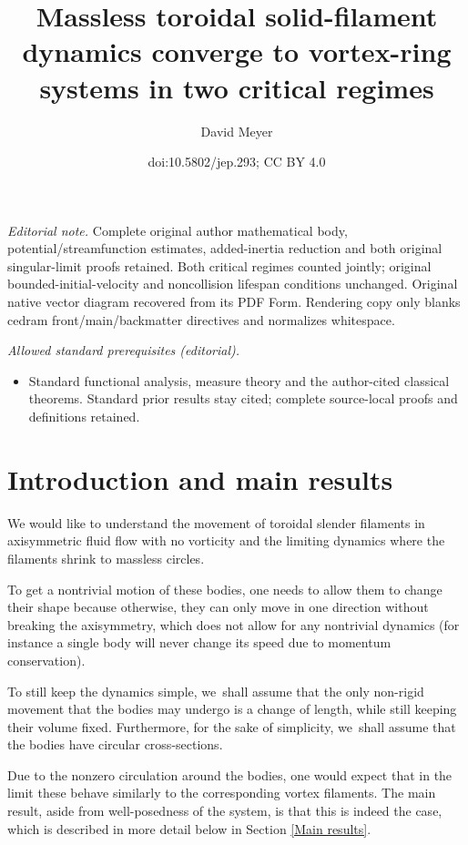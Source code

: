 \documentclass[10pt]{amsart}
\title{Massless toroidal solid-filament dynamics converge to vortex-ring systems in two critical regimes}
\author{David Meyer}
\date{doi:10.5802/jep.293; CC BY 4.0}
\theoremstyle{definition}
\begin{document}
\maketitle
\noindent\textit{Editorial note.} Complete original author mathematical body, potential/streamfunction estimates, added-inertia reduction and both original singular-limit proofs retained. Both critical regimes counted jointly; original bounded-initial-velocity and noncollision lifespan conditions unchanged. Original native vector diagram recovered from its PDF Form. Rendering copy only blanks cedram front/main/backmatter directives and normalizes whitespace.\par\medskip
\noindent\textit{Allowed standard prerequisites (editorial).}\begin{itemize}
\item Standard functional analysis, measure theory and the author-cited classical theorems. Standard prior results stay cited; complete source-local proofs and definitions retained.
\end{itemize}\medskip
\vspace*{-\baselineskip}
\tableofcontents


\section{Introduction and main results}

We would like to understand the movement of toroidal slender filaments in axisymmetric fluid flow with no vorticity and the limiting dynamics where the filaments shrink to massless circles.

To get a nontrivial motion of these bodies, one needs to allow them to change their shape because otherwise, they can only move in one direction without breaking the axisymmetry, which does not allow for any nontrivial dynamics (for instance a single body will never change its speed due to momentum conservation).

To still keep the dynamics simple, we~shall assume that the only non-rigid movement that the bodies may undergo is a change of length, while still keeping their volume fixed. Furthermore, for the sake of simplicity, we~shall assume that the bodies have circular cross-sections.

Due to the nonzero circulation
around the bodies, one would expect that in the limit these behave similarly to the corresponding vortex filaments. The main result, aside from well-posedness of the system, is that this is indeed the case, which is described in more detail below in Section \ref{Main results}.
\end{document}
